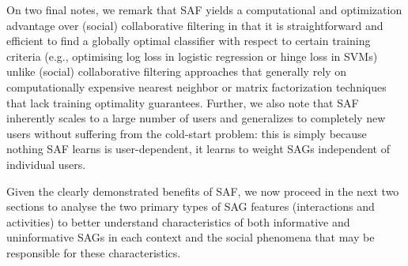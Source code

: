 On two final notes, we remark that SAF yields a computational and
optimization advantage over (social) collaborative filtering in that
it is straightforward and efficient to find a globally optimal
classifier with respect to certain training criteria (e.g., optimising
log loss in logistic regression or hinge loss in SVMs) unlike (social)
collaborative filtering approaches that generally rely on
computationally expensive nearest neighbor or matrix factorization
techniques that lack training optimality guarantees.  Further, we also
note that SAF inherently scales to a large number
of users and generalizes to completely new users without suffering
from the cold-start problem: this is simply because nothing SAF learns
is user-dependent, it learns to weight SAGs independent of individual  
users. %

Given the clearly demonstrated benefits of SAF, we now proceed in the
next two sections to analyse the two primary types of SAG features
(interactions and activities) to better understand characteristics of
both informative and uninformative SAGs in each context and the social
phenomena that may be responsible for these characteristics.
